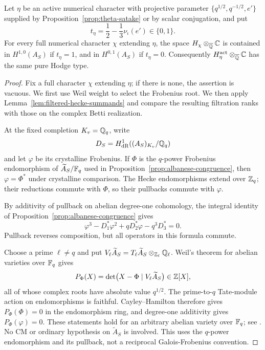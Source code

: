 \begin{proposition}\label{prop:active-hodge-types}
Let \(\eta\) be an active numerical character with projective parameter
\(\{q^{1/2},q^{-1/2},e'\}\) supplied by
Proposition~\ref{prop:theta-satake} or by scalar conjugation, and put
\[
t_\eta=\frac12-\frac13\nu_\iota(e')\in\{0,1\}.
\]
For every full numerical character \(\chi\) extending \(\eta\), the
space \(H_\chi\otimes_{\overline{\mathbb{Q}}}\mathbb{C}\) is contained in \(H^{1,0}(A_S)\)
if \(t_\eta=1\), and in \(H^{0,1}(A_S)\) if \(t_\eta=0\).
Consequently \(H^{\mathrm{act}}_\eta\otimes_{\overline{\mathbb{Q}}}\mathbb{C}\) has the same
pure Hodge type.
\end{proposition}

\begin{proof}
Fix a full character \(\chi\) extending \(\eta\); if there is none,
the assertion is vacuous.
We first use Weil weight to select the Frobenius root. We then apply
Lemma~\ref{lem:filtered-hecke-summands} and compare the resulting
filtration ranks with those on the complex Betti realization.

At the fixed completion \(K_v=\mathbb{Q}_q\), write
\[
D_S=H^1_{\mathrm{dR}}((A_S)_{K_v}/\mathbb{Q}_q)
\]
and let \(\varphi\) be its crystalline Frobenius. If \(\Phi\) is the
\(q\)-power Frobenius endomorphism of \(\widetilde A_S/\mathbb{F}_q\) used in
Proposition~\ref{prop:albanese-congruence}, then
\(\varphi=\Phi^*\) under crystalline comparison. The Hecke
endomorphisms extend over \(\mathbb{Z}_q\); their reductions commute with
\(\Phi\), so their pullbacks commute with \(\varphi\).

By additivity of pullback on abelian degree-one cohomology, the integral identity of
Proposition~\ref{prop:albanese-congruence} gives
\begin{equation}\label{eq:cohomological-frobenius-polynomial}
\varphi^3-D_1^*\varphi^2+qD_2^*\varphi-q^3D_3^*=0.
\end{equation}
Pullback reverses composition, but all operators in this formula
commute.

Choose a prime \(\ell\ne q\) and put
\(V_\ell\widetilde A_S=T_\ell\widetilde A_S\otimes_{\mathbb{Z}_\ell}\mathbb{Q}_\ell\).
Weil's theorem for abelian varieties over \(\mathbb{F}_q\) gives
\[
 P_\Phi(X)=\det\bigl(X-\Phi\mid V_\ell\widetilde A_S\bigr)\in\mathbb{Z}[X],
\]
all of whose complex roots have absolute value \(q^{1/2}\).
The prime-to-\(q\) Tate-module action on endomorphisms is faithful.
Cayley--Hamilton therefore gives \(P_\Phi(\Phi)=0\) in the
endomorphism ring, and degree-one additivity gives
\(P_\Phi(\varphi)=0\).  These statements hold for an arbitrary
abelian variety over \(\mathbb{F}_q\); see
\cite[Lemma~12.2, Proposition~12.9, and Theorem~19.1(c) with its proof]{Milne1986AbelianVarieties}.
No CM or ordinary hypothesis on \(\widetilde A_S\) is involved.
This uses the \(q\)-power endomorphism and its pullback, not a
reciprocal Galois-Frobenius convention.


\end{proof}

